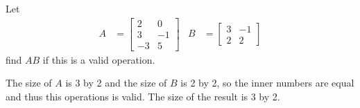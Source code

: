 \begin{example}
	Let 
\begin{align*}
	A & = 
\begin{bmatrix}
	2 & 0 \\ 3 & -1 \\ -3 & 5 
\end{bmatrix}
& B& = 
\begin{bmatrix}
	3 & -1 \\ 2 & 2 
\end{bmatrix}
\end{align*}
find $AB$ if this is a valid operation. 

\solution

The size of $A$ is 3 by 2 and the size of $B$ is 2 by 2, so the inner numbers are equal and thus this operations is valid.  The size of the result is 3 by 2. 


\end{example}
